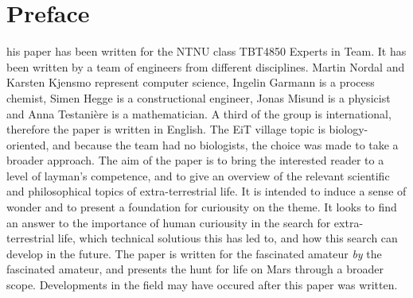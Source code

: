 \section*{Preface}
his paper has been written for the NTNU class TBT4850 Experts in Team.
It has been written by a team of engineers from different disciplines.
Martin Nordal and Karsten Kjensmo represent computer science, Ingelin Garmann is a process chemist, Simen Hegge is a constructional engineer, Jonas Misund is a physicist and Anna Testani\`{e}re is a mathematician.
A third of the group is international, therefore the paper is written in English. 
The EiT village topic is biology-oriented, and because the team had no biologists, the choice was made to take a broader approach. 
The aim of the paper is to bring the interested reader to a level of layman's competence, and to give an overview of the relevant scientific and philosophical topics of extra-terrestrial life.
It is intended to induce a sense of wonder and to present a foundation for curiousity on the theme. It looks to find an answer to the importance of human curiousity in the search for extra-terrestrial life, which technical solutious this has led to, and how this search can develop in the future.  
The paper is written for the fascinated amateur \emph{by} the fascinated amateur, and presents the hunt for life on Mars through a broader scope. 
Developments in the field may have occured after this paper was written. 